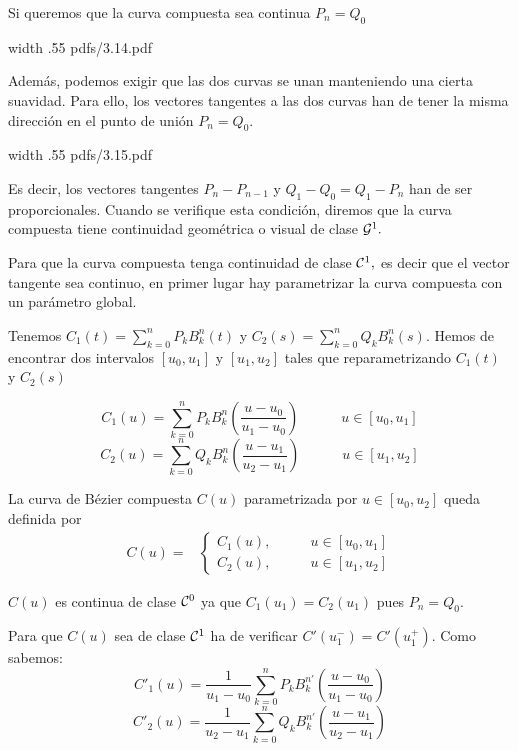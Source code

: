 \documentclass[twoside]{report}
\newcommand{\colocapdf}[2]{\quad\pdfimage width #2 {pdfs/#1.pdf}}
\begin{document}
Si queremos que la curva compuesta sea continua $P_n=Q_0$

\begin{center}
\colocapdf{3.14}{.55\textwidth}
\end{center}

Adem\'{a}s, podemos exigir que las dos curvas se unan manteniendo una cierta suavidad. Para ello, los vectores tangentes a las dos curvas han de tener la misma direcci\'{o}n en el punto de uni\'{o}n $P_n=Q_0.$

\begin{center}
\colocapdf{3.15}{.55\textwidth}
\end{center}

Es decir, los vectores tangentes $P_n-P_{n-1}$ y $Q_1-Q_0=Q_1-P_n$ han de ser proporcionales. Cuando se verifique esta condici\'{o}n, diremos que la curva compuesta tiene continuidad geom\'{e}trica o visual de clase ${\cal G}^1.$

Para que la curva compuesta tenga continuidad de clase ${\cal C}^1,$ es decir que el vector tangente sea continuo, en primer lugar hay parametrizar la curva compuesta con un par\'{a}metro global.

\vspace{0.3cm}

Tenemos $C_1(t)=\sum_{k=0}^n P_k B_k^n(t)$ y $C_2(s)=\sum_{k=0}^n Q_k B_k^n(s)$. Hemos de encontrar dos intervalos $[u_0,u_1]$ y $[u_1,u_2]$ tales que reparametrizando $C_1(t)$ y $C_2(s)$

$$C_1(u)=\sum_{k=0}^n P_k B_k^n\left(\frac{u-u_0}{u_1-u_0}\right) \quad \quad \quad u\in [u_0,u_1]$$
$$C_2(u)=\sum_{k=0}^n Q_k B_k^n\left(\frac{u-u_1}{u_2-u_1}\right)\quad \quad \quad u\in [u_1,u_2]$$

La curva de B\'{e}zier compuesta $C(u)$ parametrizada por $u\in[u_0,u_2]$ queda definida por
$$\begin{array}{cc} C(u)=& \left\{\begin{array}{cc} C_1(u), & \quad \quad u\in [u_0,u_1]\\ C_2(u), & \quad \quad u\in [u_1,u_2]\end{array}\right. \end{array}$$

$C(u)$ es continua de clase ${\cal C}^0$ ya que $C_1(u_1)=C_2(u_1)$ pues $P_n=Q_0.$

Para que $C(u)$ sea de clase ${\cal C}^1$ ha de verificar $C'(u_1^{-})=C'(u_1^{+}).$ Como sabemos:
$$C'_1(u)=\frac{1}{u_1-u_0}\sum_{k=0}^n P_k B_k^{n \prime} \left(\frac{u-u_0}{u_1-u_0}\right)$$
$$C'_2(u)=\frac{1}{u_2-u_1}\sum_{k=0}^n Q_k B_k^{n \prime} \left(\frac{u-u_1}{u_2-u_1}\right)$$
\end{document}

